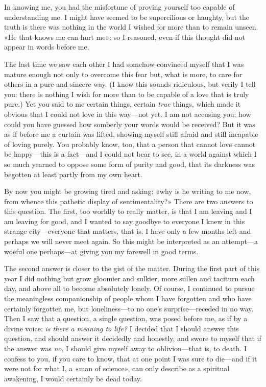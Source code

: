\documentclass[a4paper]{article}
\begin{document}
In knowing me, you had the misfortune of proving yourself too capable of
understanding me. I might have seemed to be supercilious or haughty, but the
truth is there was nothing in the world I wished for more than to remain unseen.
«He that knows me can hurt me»: so I reasoned, even if this thought did not
appear in words before me. 

The last time we saw each other I had somehow convinced myself that I was mature
enough not only to overcome this fear but, what is more, to care for others in
a pure and sincere way. (I know this sounds ridiculous, but verily I tell you:
there is nothing I wish for more than to be capable of a love that is
truly pure.) Yet you said to me certain things, certain \textit{true} things,
which made it obvious that I could not love in this way---not yet. I am
not accusing you: how could you have guessed how somberly your words would be
received? But it was as if before me a curtain was lifted, showing myself still afraid
and still incapable of loving purely. You probably know, too, that a person that
cannot love cannot be happy---this is a fact---and I could not bear to
see, in a world against which I so much yearned to oppose some form of purity
and good, that its darkness was begotten at least partly from my own heart.

By now you might be growing tired and asking: «why is he writing to me now, from
whence this pathetic display of sentimentality?» There are two answers to this
question. The first, too worldly to really matter, is that I am leaving and I am
leaving for good, and I wanted to say goodbye to everyone I knew in this strange
city---everyone that matters, that is. I have only a few months left and perhaps
we will never meet again. So this might be interpreted as an attempt---a woeful
one perhaps---at giving you my farewell in good terms.

The second answer is closer to the gist of the matter. During the first part of
this year I did nothing but grow gloomier and sulkier, more sullen and
taciturn each day, and above all to become absolutely lonely. Of course, I
continued to pursue the meaningless companionship of people whom I have
forgotten and who have certainly forgotten me, but loneliness---to no one's
surprise---receded in no way. Then I
saw that a question, a single question, was posed before me, as if by a divine
voice: \textit{is there a meaning to life?} I decided that I should answer this
question, and should answer it decidedly and honestly, and swore to myself
that if the answer was \textit{no}, I should give myself away to oblivion---that is, to
death. I confess to you, if you care to know, that at one point I was sure to
die---and if it were not for what I, a «man of science», can only describe as a
spiritual awakening, I would certainly be dead today.
\end{document}
